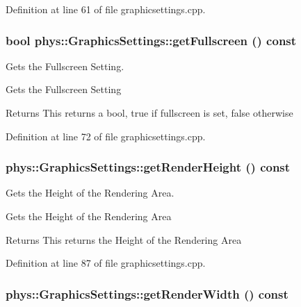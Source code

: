 Definition at line 61 of file graphicsettings.cpp.

\hypertarget{classphys_1_1GraphicsSettings_a8871ea7d5c65c3b59d1d34b59531743f}{
\subsubsection[{getFullscreen}]{\setlength{\rightskip}{0pt plus 5cm}bool phys::GraphicsSettings::getFullscreen () const}}
\label{dc/df1/classphys_1_1GraphicsSettings_a8871ea7d5c65c3b59d1d34b59531743f}


Gets the Fullscreen Setting. 

Gets the Fullscreen Setting \begin{DoxyReturn}{Returns}
This returns a bool, true if fullscreen is set, false otherwise 
\end{DoxyReturn}


Definition at line 72 of file graphicsettings.cpp.

\hypertarget{classphys_1_1GraphicsSettings_a118171db4fc0a2b17da4284cc91fbeb4}{
\subsubsection[{getRenderHeight}]{ phys::GraphicsSettings::getRenderHeight () const}}
\label{dc/df1/classphys_1_1GraphicsSettings_a118171db4fc0a2b17da4284cc91fbeb4}


Gets the Height of the Rendering Area. 

Gets the Height of the Rendering Area \begin{DoxyReturn}{Returns}
This returns the Height of the Rendering Area 
\end{DoxyReturn}


Definition at line 87 of file graphicsettings.cpp.

\hypertarget{classphys_1_1GraphicsSettings_aa8a8548afca8d3e127a1be69a2c1eba2}{
\subsubsection[{getRenderWidth}]{ phys::GraphicsSettings::getRenderWidth () const}}
\label{dc/df1/classphys_1_1GraphicsSettings_aa8a8548afca8d3e127a1be69a2c1eba2}


